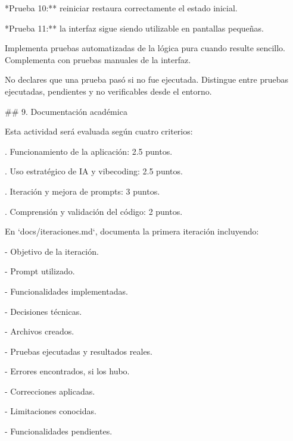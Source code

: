 \noindent **Prueba 10:** reiniciar restaura correctamente el estado inicial.\par
\par\smallskip
\noindent **Prueba 11:** la interfaz sigue siendo utilizable en pantallas pequeñas.\par
\par\smallskip
\noindent Implementa pruebas automatizadas de la lógica pura cuando resulte sencillo. Complementa con pruebas manuales de la interfaz.\par
\par\smallskip
\noindent No declares que una prueba pasó si no fue ejecutada. Distingue entre pruebas ejecutadas, pendientes y no verificables desde el entorno.\par
\par\smallskip
\noindent \#\# 9. Documentación académica\par
\par\smallskip
\noindent Esta actividad será evaluada según cuatro criterios:\par
\par\smallskip
{}. Funcionamiento de la aplicación: 2.5 puntos.\par
{}. Uso estratégico de IA y vibecoding: 2.5 puntos.\par
{}. Iteración y mejora de prompts: 3 puntos.\par
{}. Comprensión y validación del código: 2 puntos.\par
\par\smallskip
\noindent En `docs/iteraciones.md`, documenta la primera iteración incluyendo:\par
\par\smallskip
\noindent - Objetivo de la iteración.\par
\noindent - Prompt utilizado.\par
\noindent - Funcionalidades implementadas.\par
\noindent - Decisiones técnicas.\par
\noindent - Archivos creados.\par
\noindent - Pruebas ejecutadas y resultados reales.\par
\noindent - Errores encontrados, si los hubo.\par
\noindent - Correcciones aplicadas.\par
\noindent - Limitaciones conocidas.\par
\noindent - Funcionalidades pendientes.\par

